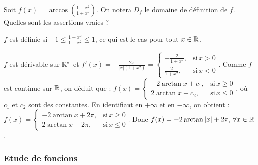 \begin{question} 

Soit $f(x)= \arccos (\frac{1-x^2}{1+x^2})$. On notera $D_f$ le domaine de définition de $f$. Quelles sont les assertions vraies ?
\begin{answers}



\end{answers}
\begin{explanations}
$f$ est définie si $-1\le \frac{1-x^2}{1+x^2} \le 1 $, ce qui est le cas pour tout $x \in \mathbb{R}$.

$f$ est dérivable sur $\mathbb{R}^*$ et $f'(x) = -\frac{2x}{|x|(1+x^2)} =\left\{\begin{array}{cc}-\frac{2}{1+x^2},& \mbox{si} \, x>0 \\ \frac{2}{1+x^2},& \mbox{si} \, x<0 \end{array}\right. $. Comme $f$ est continue sur $\mathbb{R}$, on déduit que : 
$f(x)= \left\{\begin{array}{cc}-2\arctan x + c_1, & \mbox{si} \, x\ge 0 \\ 2\arctan x + c_2, & \mbox{si} \, x\le 0 \end{array}\right. $, où $c_1$ et $ c_2$  sont des constantes.
En identifiant en $+\infty$ et en $-\infty$, on obtient : 
$f(x)= \left\{\begin{array}{cc}-2\arctan x+2\pi, & \mbox{si} \, x\ge 0 \\ 2\arctan x +2\pi, & \mbox{si} \, x\le 0 \end{array}\right.$.  Donc $f(x)  = -2\arctan |x|+2\pi, \, \forall x \in \mathbb{R}$.

\end{explanations}

\end{question}




\subsubsection{Etude de foncions}



